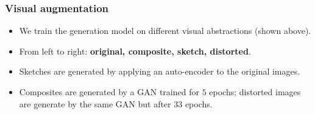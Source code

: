 \documentclass[aspectratio=1610]{beamer} %
\begin{document}
\begin{frame}
\frametitle{Visual augmentation}
\begin{figure}[htbp]
\centering
{}
\label{fig:generalexample}
\end{figure}
\begin{itemize}
	\item We train the generation model on different visual abstractions (shown above).
	\item From left to right: \textbf{original, composite, sketch, distorted}.
	\item Sketches are generated by applying an auto-encoder to the original images.
	\item Composites are generated by a GAN trained for $5$ epochs; distorted images are generate by the same GAN but after $33$ epochs.
\end{itemize}
\end{frame}
\end{document}
